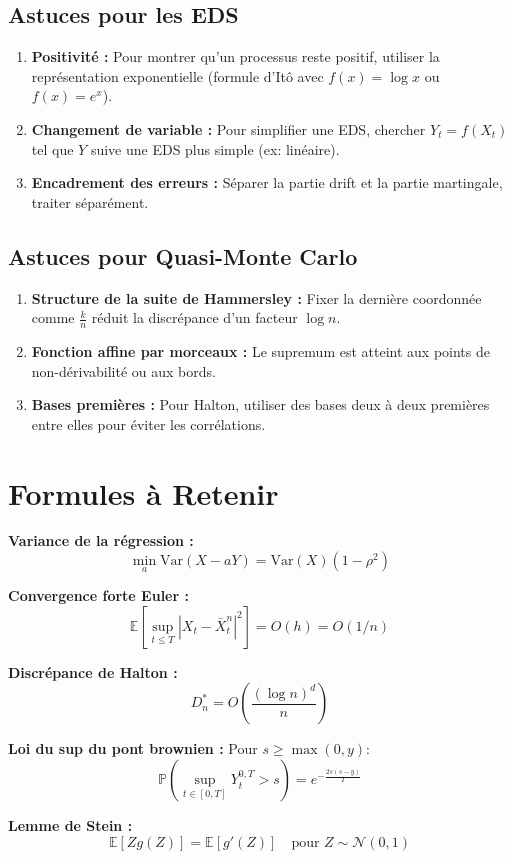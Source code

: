 \documentclass[12pt,a4paper]{article}
\theoremstyle{definition}
\newcommand{\E}{\mathbb{E}}
\newcommand{\Var}{\mathrm{Var}}
\newcommand{\prob}{\mathbb{P}}
\begin{document}
\subsection{Astuces pour les EDS}

\begin{enumerate}
    \item \textbf{Positivité :} Pour montrer qu'un processus reste positif, utiliser la représentation exponentielle (formule d'Itô avec $f(x) = \log x$ ou $f(x) = e^x$).
    
    \item \textbf{Changement de variable :} Pour simplifier une EDS, chercher $Y_t = f(X_t)$ tel que $Y$ suive une EDS plus simple (ex: linéaire).
    
    \item \textbf{Encadrement des erreurs :} Séparer la partie drift et la partie martingale, traiter séparément.
\end{enumerate}

\subsection{Astuces pour Quasi-Monte Carlo}

\begin{enumerate}
    \item \textbf{Structure de la suite de Hammersley :} Fixer la dernière coordonnée comme $\frac{k}{n}$ réduit la discrépance d'un facteur $\log n$.
    
    \item \textbf{Fonction affine par morceaux :} Le supremum est atteint aux points de non-dérivabilité ou aux bords.
    
    \item \textbf{Bases premières :} Pour Halton, utiliser des bases deux à deux premières entre elles pour éviter les corrélations.
\end{enumerate}

\section{Formules à Retenir}

\begin{tcolorbox}[colback=yellow!10!white,colframe=orange!75!black,title=Formules Essentielles]

\textbf{Variance de la régression :}
\[
\min_a \Var(X - aY) = \Var(X)(1 - \rho^2)
\]

\textbf{Convergence forte Euler :}
\[
\E\left[\sup_{t \leq T} |X_t - \bar{X}_t^n|^2\right] = O(h) = O(1/n)
\]

\textbf{Discrépance de Halton :}
\[
D_n^* = O\left(\frac{(\log n)^d}{n}\right)
\]

\textbf{Loi du sup du pont brownien :} Pour $s \geq \max(0, y)$:
\[
\prob\left(\sup_{t \in [0,T]} Y_t^{0,T} > s\right) = e^{-\frac{2s(s-y)}{T}}
\]

\textbf{Lemme de Stein :}
\[
\E[Zg(Z)] = \E[g'(Z)] \quad \text{pour } Z \sim \mathcal{N}(0,1)
\]

\end{tcolorbox}
\end{document}
